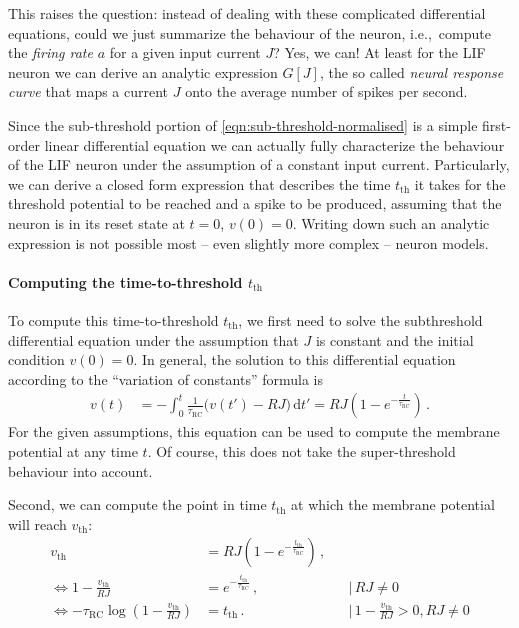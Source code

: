 \documentclass[10pt,letterpaper,oneside]{article}
\begin{document}
This raises the question: instead of dealing with these complicated differential equations, could we just summarize the behaviour of the neuron, i.e.,~compute the \emph{firing rate} $a$ for a given input current $J$? Yes, we can! At least for the LIF neuron we can derive an analytic expression $G[J]$, the so called \emph{neural response curve} that maps a current $J$ onto the average number of spikes per second.


Since the sub-threshold portion of \cref{eqn:sub-threshold-normalised} is a simple first-order linear differential equation we can actually fully characterize the behaviour of the LIF neuron under the assumption of a constant input current. Particularly, we can derive a closed form expression that describes the time $t_\mathrm{th}$ it takes for the threshold potential to be reached and a spike to be produced, assuming that the neuron is in its reset state at $t=0$, $v(0) = 0$. Writing down such an analytic expression is not possible most -- even slightly more complex -- neuron models.

\paragraph{Computing the time-to-threshold $t_\mathrm{th}$}
To compute this time-to-threshold $t_\mathrm{th}$, we first need to solve the subthreshold differential equation under the assumption that $J$ is constant and the initial condition $v(0) = 0$. In general, the solution to this differential equation according to the \enquote{variation of constants} formula is
\begin{align*}
	v(t) &= - \int_0^t \frac{1}{\tau_\mathrm{RC}} \big( v(t') - RJ \big) \,\mathrm{d}t'
	      = RJ \left(1 - e^{-\frac{t}{\tau_\mathrm{RC}}} \right) \,.
\end{align*}
For the given assumptions, this equation can be used to compute the membrane potential at any time $t$. Of course, this does not take the super-threshold behaviour into account.

Second, we can compute the point in time $t_\mathrm{th}$ at which the membrane potential will reach $v_\mathrm{th}$:
\begin{align*}
	v_\mathrm{th} &= RJ \left(1 - e^{-\frac{t_\mathrm{th}}{\tau_\mathrm{RC}}} \right) \,, \\
	\Leftrightarrow 1 - \frac{v_\mathrm{th}}{RJ} &= e^{-\frac{t_\mathrm{th}}{\tau_\mathrm{RC}}} \,, && \Big| \, RJ \neq 0 \\
	\Leftrightarrow - \tau_\mathrm{RC} \log \left( 1 - \frac{v_\mathrm{th}}{RJ} \right) &= t_\mathrm{th} \,.  && \Big| \, 1 - \frac{v_\mathrm{th}}{RJ} > 0 , RJ \neq 0
\end{align*}
\end{document}
